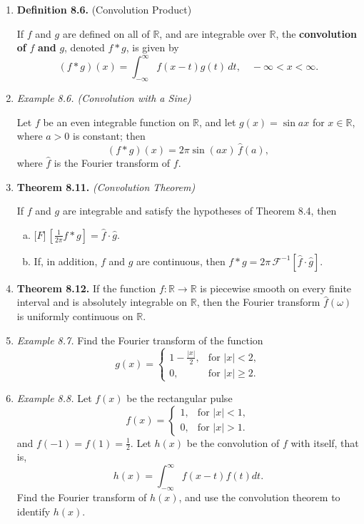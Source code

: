 \begin{enumerate}
\newpage


\item \textbf{Definition 8.6.} (Convolution Product)

If $f$ and $g$ are defined on all of $\mathbb{R}$, and are integrable over $\mathbb{R}$, the \textbf{convolution of} $f$ \textbf{and} $g$, denoted $f*g$, is given by
\[(f*g)(x) = \int _{-\infty}^{\infty} f(x-t)g(t)\, dt,\quad -\infty <x<\infty.\]




\item \textit{Example 8.6. (Convolution with a Sine)}

Let $f$ be an even integrable function on $\mathbb{R}$, and let $g(x) = \sin ax$ for $x \in \mathbb{R}$, where $a > 0$ is constant; then
\[ (f * g) (x) = 2\pi\sin (a x) \, \widehat f (a),\]
where $\hat f$ is the Fourier transform of $f$.

\newpage 

\item \textbf{Theorem 8.11.} \textit{(Convolution Theorem)}

If $f$ and $g$ are integrable and satisfy the hypotheses of Theorem 8.4, then
\begin{enumerate}[(a)]
    \item $\displaystyle \mathcal[F]\, \left[ \frac{1}{2\pi} f * g\right] = \widehat{f}\cdot \widehat{g}.$
    \item If, in addition, $f$ and $g$ are continuous, then $f * g = 2\pi \, \mathcal{F} ^{-1} \left[  \widehat{f} \cdot \widehat{g} \right] $.
\end{enumerate}


\item \textbf{Theorem 8.12.} If the function $f : \mathbb{R} \to \mathbb{R}$ is piecewise smooth on every
finite interval and is absolutely integrable on $\mathbb{R}$, then the Fourier transform $\widehat{f}(\omega)$ is uniformly continuous on $\mathbb{R}$.


\item \textit{Example 8.7.} Find the Fourier transform of the function
\[ g(x)=
\begin{cases}
    \displaystyle 1 - \frac{|x|}{2}, & \text{for } |x|<2,\\
    0, & \text{for } |x|\geq 2.
\end{cases}\]

    \newpage 
    \item \textit{Example 8.8.}
    Let $f(x)$ be the rectangular pulse
    \[ f(x)=
    \begin{cases}
        1, & \text{for } |x| < 1,\\
        0, & \text{for } |x| > 1.
    \end{cases}\]
    and $f (-1) = f (1) = \frac{1}{2}$. Let $h(x)$ be the convolution of $f$ with itself, that is,
    \[h(x)=\int_{-\infty}^{\infty} f(x-t) f(t) dt.\]
    Find the Fourier transform of $h(x)$, and use the convolution theorem to identify $h(x)$.


\end{enumerate}

